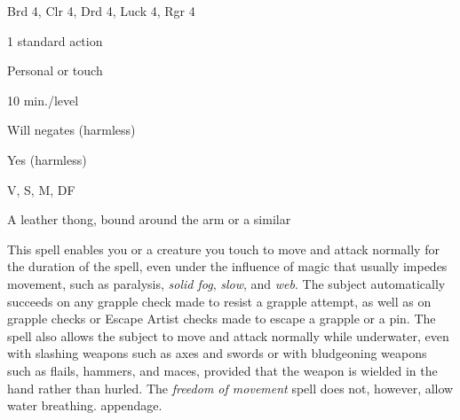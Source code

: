 
\begin{description*}
\item[Level:] Brd 4, Clr 4, Drd 4, Luck 4, Rgr 4
\item[Casting Time:] 1 standard action
\item[Range:] Personal or touch
\item[Duration:] 10 min./level
\item[Saving Throw:] Will negates (harmless)
\item[Spell Resistance:] Yes (harmless)
\item[Components:] V, S, M, DF
\item[Arcane Material Component:] A leather thong, bound around the arm or a similar
\end{description*}

This spell enables you or a creature you touch to move and attack normally for
the duration of the spell, even under the influence of magic that usually impedes
movement, such as paralysis, \textit{solid fog}, \textit{slow}, and \textit{web}.
The subject automatically succeeds on any grapple check made to resist a grapple
attempt, as well as on grapple checks or Escape Artist checks made to escape a
grapple or a pin.
The spell also allows the subject to move and attack normally while underwater,
even with slashing weapons such as axes and swords or with bludgeoning weapons
such as flails, hammers, and maces, provided that the weapon is wielded in the
hand rather than hurled. The \textit{freedom of movement} spell does not, however,
allow water breathing.
appendage.